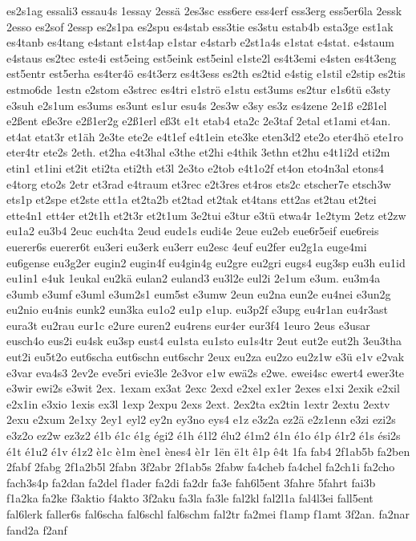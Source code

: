{es2s1ag
essali3
essau4s
1essay
2essä
2es3sc
ess6ere
ess4erf
ess3erg
ess5er6la
2essk
2esso
es2sof
2essp
es2s1pa
es2spu
es4stab
ess3tie
es3stu
estab4b
esta3ge
est1ak
es4tanb
es4tang
e4stant
e1st4ap
e1star
e4starb
e2st1a4s
e1stat
e4stat.
e4staum
e4staus
es2tec
este4i
est5eing
est5eink
est5einl
e1ste2l
es4t3emi
e4sten
es4t3eng
est5entr
est5erha
es4ter4ö
es4t3erz
es4t3ess
es2th
es2tid
e4stig
e1stil
e2stip
es2tis
estmo6de
1estn
e2stom
e3strec
es4tri
e1strö
e1stu
est3ums
es2tur
e1s6tü
e3sty
e3suh
e2s1um
es3ums
es3unt
es1ur
esu4s
2es3w
e3sy
es3z
es4zene
2e1ß
e2ß1el
e2ßent
eße3re
e2ß1er2g
e2ß1erl
eß3t
e1t
etab4
eta2c
2e3taf
2etal
et1ami
et4an.
et4at
etat3r
et1äh
2e3te
ete2e
e4t1ef
e4t1ein
ete3ke
eten3d2
ete2o
eter4hö
ete1ro
eter4tr
ete2s
2eth.
et2ha
e4t3hal
e3the
et2hi
e4thik
3ethn
et2hu
e4t1i2d
eti2m
etin1
et1ini
et2it
eti2ta
eti2th
et3l
2e3to
e2tob
e4t1o2f
et4on
eto4n3al
etons4
e4torg
eto2s
2etr
et3rad
e4traum
et3rec
e2t3res
et4ros
ets2c
etscher7e
etsch3w
ets1p
et2spe
et2ste
ett1a
et2ta2b
et2tad
et2tak
et4tans
ett2as
et2tau
et2tei
ette4n1
ett4er
et2t1h
et2t3r
et2t1um
3e2tui
e3tur
e3tü
etwa4r
1e2tym
2etz
et2zw
eu1a2
eu3b4
2euc
euch4ta
2eud
eude1s
eudi4e
2eue
eu2eb
eue6r5eif
eue6reis
euerer6s
euerer6t
eu3eri
eu3erk
eu3err
eu2esc
4euf
eu2fer
eu2g1a
euge4mi
eu6gense
eu3g2er
eugin2
eugin4f
eu4gin4g
eu2gre
eu2gri
eugs4
eug3sp
eu3h
eu1id
eu1in1
e4uk
1eukal
eu2kä
eulan2
euland3
eu3l2e
eul2i
2e1um
e3um.
eu3m4a
e3umb
e3umf
e3uml
e3um2s1
eum5st
e3umw
2eun
eu2na
eun2e
eu4nei
e3un2g
eu2nio
eu4nis
eunk2
eun3ka
eu1o2
eu1p
e1up.
eu3p2f
e3upg
eu4r1an
eu4r3ast
eura3t
eu2rau
eur1c
e2ure
euren2
eu4rens
eur4er
eur3f4
1euro
2eus
e3usar
eusch4o
eus2i
eu4sk
eu3sp
eust4
eu1sta
eu1sto
eu1s4tr
2eut
eut2e
eut2h
3eu3tha
eut2i
eu5t2o
eut6scha
eut6schn
eut6schr
2eux
eu2za
eu2zo
eu2z1w
e3ü
e1v
e2vak
e3var
eva4s3
2ev2e
eve5ri
evie3le
2e3vor
e1w
ewä2s
e2we.
ewei4sc
ewert4
ewer3te
e3wir
ewi2s
e3wit
2ex.
1exam
ex3at
2exc
2exd
e2xel
ex1er
2exes
e1xi
2exik
e2xil
e2x1in
e3xio
1exis
ex3l
1exp
2expu
2exs
2ext.
2ex2ta
ex2tin
1extr
2extu
2extv
2exu
e2xum
2e1xy
2ey1
eyl2
ey2n
ey3no
eys4
e1z
e3z2a
ez2ä
e2z1enn
e3zi
ezi2s
e3z2o
ez2w
ez3z2
é1b
é1c
é1g
égi2
é1h
é1l2
élu2
é1m2
é1n
é1o
é1p
é1r2
é1s
ési2s
é1t
é1u2
é1v
é1z2
è1c
è1m
ène1
ènes4
è1r
1ën
ë1t
ê1p
ê4t
1fa
fab4
2f1ab5b
fa2ben
2fabf
2fabg
2f1a2b5l
2fabn
3f2abr
2f1ab5s
2fabw
fa4cheb
fa4chel
fa2ch1i
fa2cho
fach3s4p
fa2dan
fa2del
f1ader
fa2di
fa2dr
fa3e
fah6l5ent
3fahre
5fahrt
fai3b
f1a2ka
fa2ke
f3aktio
f4akto
3f2aku
fa3la
fa3le
fal2kl
fal2l1a
fal4l3ei
fall5ent
fal6lerk
faller6s
fal6scha
fal6schl
fal6schm
fal2tr
fa2mei
f1amp
f1amt
3f2an.
fa2nar
fand2a
f2anf
}

